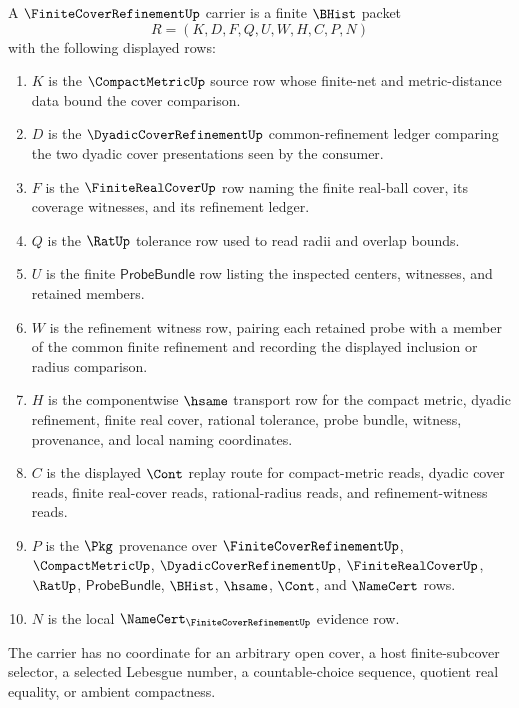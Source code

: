 \begin{definition}
\label{def:finite-cover-refinement-carrier}
A $\FiniteCoverRefinementUp$ carrier is a finite $\BHist$ packet
$$
R=(K,D,F,Q,U,W,H,C,P,N)
$$
with the following displayed rows:
\begin{enumerate}
\item $K$ is the $\CompactMetricUp$ source row whose finite-net and metric-distance data bound the cover comparison.
\item $D$ is the $\DyadicCoverRefinementUp$ common-refinement ledger comparing the two dyadic cover presentations seen by the consumer.
\item $F$ is the $\FiniteRealCoverUp$ row naming the finite real-ball cover, its coverage witnesses, and its refinement ledger.
\item $Q$ is the $\RatUp$ tolerance row used to read radii and overlap bounds.
\item $U$ is the finite $\mathsf{ProbeBundle}$ row listing the inspected centers, witnesses, and retained members.
\item $W$ is the refinement witness row, pairing each retained probe with a member of the common finite refinement and recording the displayed inclusion or radius comparison.
\item $H$ is the componentwise $\hsame$ transport row for the compact metric, dyadic refinement, finite real cover, rational tolerance, probe bundle, witness, provenance, and local naming coordinates.
\item $C$ is the displayed $\Cont$ replay route for compact-metric reads, dyadic cover reads, finite real-cover reads, rational-radius reads, and refinement-witness reads.
\item $P$ is the $\Pkg$ provenance over $\FiniteCoverRefinementUp$, $\CompactMetricUp$, $\DyadicCoverRefinementUp$, $\FiniteRealCoverUp$, $\RatUp$, $\mathsf{ProbeBundle}$, $\BHist$, $\hsame$, $\Cont$, and $\NameCert$ rows.
\item $N$ is the local $\NameCert_{\FiniteCoverRefinementUp}$ evidence row.
\end{enumerate}
The carrier has no coordinate for an arbitrary open cover, a host finite-subcover selector, a selected Lebesgue number, a countable-choice sequence, quotient real equality, or ambient compactness.
\end{definition}

